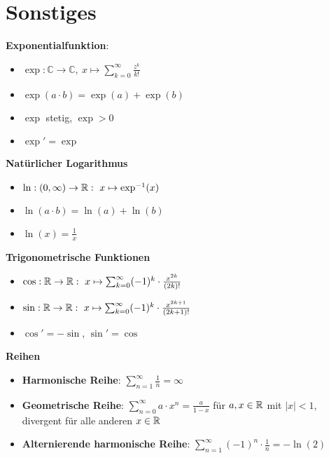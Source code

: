 \section{Sonstiges}


\textbf{Exponentialfunktion}:
\begin{itemize}
\item $\exp:\mathbb{C}\to\mathbb{C},\ x\mapsto\sum_{k=0}^\infty \frac{z^k}{k!}$

\item $\exp(a\cdot b)=\exp(a)+\exp(b)$

\item $\exp$ stetig, $\exp>0$

\item $\exp'=\exp$
\end{itemize}

\textbf{Natürlicher Logarithmus}
\begin{itemize}
\item $\ln: (0,\infty)\to\R:\ x\mapsto\exp^{-1}(x)$

\item $\ln(a\cdot b)=\ln(a)+\ln(b)$

\item $\ln(x)=\frac{1}{x}$
\end{itemize}

\textbf{Trigonometrische Funktionen}
\begin{itemize}
\item $\cos:\R\to\R:\ x\mapsto\sum_{k=0}^\infty (-1)^k\cdot\frac{x^{2k}}{(2k)!}$

\item $\sin:\R\to\R:\ x\mapsto\sum_{k=0}^\infty (-1)^k\cdot\frac{x^{2k+1}}{(2k+1)!}$

\item $\cos' = -\sin$, $\sin' = \cos$
\end{itemize}

\textbf{Reihen}
\begin{itemize}
\item \textbf{Harmonische Reihe}: $\sum_{n=1}^\infty \frac{1}{n}=\infty$

\item \textbf{Geometrische Reihe}: $\sum_{n=0}^\infty a\cdot x^n = \frac{a}{1-x}$
für $a,x\in\mathbb{R}$ mit $|x|<1$, divergent für alle anderen $x\in\mathbb{R}$

\item \textbf{Alternierende harmonische Reihe}:
$\sum_{n=1}^\infty (-1)^n\cdot\frac{1}{n}=-\ln(2)$
\end{itemize}